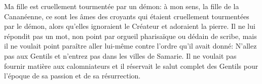 Ma fille est cruellement tourmentée par un démon:
	à mon sens, la fille de la Cananéenne,
	ce sont les âmes des croyants
		qui étaient cruellement tourmentées par le démon,
	alors qu’elles ignoraient le Créateur et adoraient la pierre.
Il ne lui répondit pas un mot,
	non point par orgueil pharisaïque ou dédain de scribe,
	mais il ne voulait point paraître aller lui-même
		contre l’ordre qu’il avait donné:
	N’allez pas aux Gentils et n’entrez pas dans les villes de Samarie.
Il ne voulait pas fournir matière aux calomniateurs
	et il réservait le salut complet des Gentils
	pour l’époque de sa passion et de sa résurrection.
